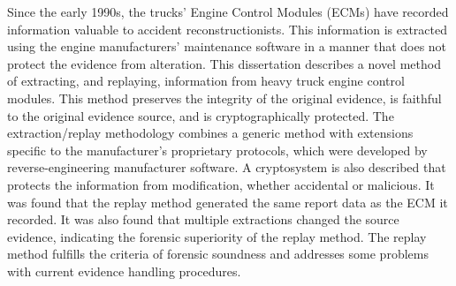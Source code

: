 Since the early 1990s, the trucks' Engine Control Modules (ECMs) have recorded information valuable to accident
reconstructionists. This information is extracted using the engine manufacturers' maintenance software in
a manner that does not protect the evidence from alteration. This dissertation describes a novel method
of extracting, and replaying, information from heavy truck engine control modules. This method preserves
the integrity of the original evidence, is faithful to the original evidence source, and is cryptographically
protected. The extraction/replay methodology combines a generic method with extensions specific to
the manufacturer's proprietary protocols, which were developed by reverse-engineering manufacturer software.
A cryptosystem is also described that protects the information from modification, whether accidental or malicious.
It was found that the replay method generated the same report data as the ECM it recorded. It was also found that
multiple extractions changed the source evidence, indicating the forensic superiority of the replay method.
The replay method fulfills the criteria of forensic soundness and addresses some problems with current
evidence handling procedures.
